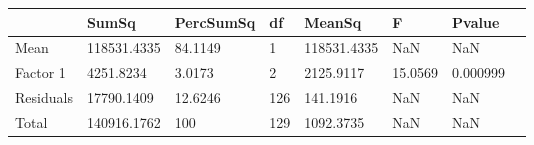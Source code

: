 \begin{table} 
\begin{tabular}{llllllll}
 & SumSq & PercSumSq & df & MeanSq & F & Pvalue \\ 
 \hline 
Mean & 118531.4335 & 84.1149 & 1 & 118531.4335 & NaN & NaN \\ 
Factor 1 & 4251.8234 & 3.0173 & 2 & 2125.9117 & 15.0569 & 0.000999 \\ 
Residuals & 17790.1409 & 12.6246 & 126 & 141.1916 & NaN & NaN \\ 
Total & 140916.1762 & 100 & 129 & 1092.3735 & NaN & NaN \\ 
\end{tabular} 
\end{table} 
